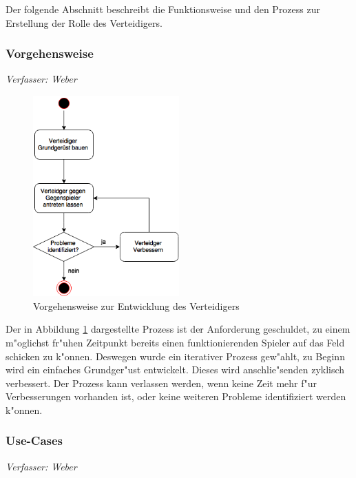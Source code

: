 
Der folgende Abschnitt beschreibt die Funktionsweise und den Prozess zur Erstellung der Rolle des Verteidigers.

\subsubsection{Vorgehensweise}
\textit{Verfasser: Weber}\\

\begin{figure}[H]
	\centering
	\includegraphics[width=0.5\textwidth]{Grafiken/KI/defender/vorgehensweise.png}
	\caption{Vorgehensweise zur Entwicklung des Verteidigers}
	\label{Vorgehensweise-Verteidigers}
\end{figure}
Der in Abbildung \ref{Vorgehensweise-Verteidigers} dargestellte Prozess ist der Anforderung geschuldet, zu einem m"oglichst fr"uhen Zeitpunkt bereits einen funktionierenden Spieler auf das Feld schicken zu k"onnen. Deswegen wurde ein iterativer Prozess gew"ahlt, zu Beginn wird ein einfaches Grundger"ust entwickelt. Dieses wird anschlie"senden zyklisch verbessert. Der Prozess kann verlassen werden, wenn keine Zeit mehr f"ur Verbesserungen vorhanden ist, oder keine weiteren Probleme identifiziert werden k"onnen.

\subsubsection{Use-Cases}
\textit{Verfasser: Weber}\\

